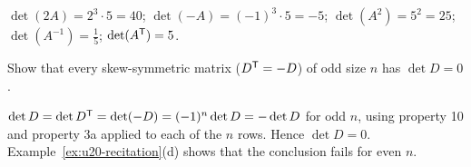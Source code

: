 \begin{solution}
$\det(2A)=2^3\cdot 5=40$; $\det(-A)=(-1)^3\cdot 5=-5$; $\det(A^2)=5^2=25$;
$\det(A^{-1})=\frac15$; $\det(A^{\mathsf{T}})=5$.
\end{solution}

\begin{exercise}\label{ex:u20-skew}
Show that every skew-symmetric matrix ($D^{\mathsf{T}}=-D$) of odd size $n$ has $\det D=0$.
\end{exercise}

\begin{solution}
$\det D=\det D^{\mathsf{T}}=\det(-D)=(-1)^n\det D=-\det D$ for odd $n$, using property 10 and
property 3a applied to each of the $n$ rows. Hence $\det D=0$. Example~\ref{ex:u20-recitation}(d)
shows that the conclusion fails for even $n$.
\end{solution}
